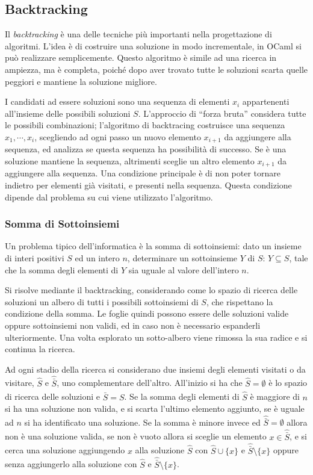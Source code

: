 \documentclass{article}
\numberwithin{equation}{subsection}
\begin{document}
\subsection{Backtracking}

Il \textit{backtracking} è una delle tecniche più importanti nella progettazione di algoritmi. L'idea è di costruire una soluzione in modo incrementale, in OCaml si può realizzare semplicemente. Questo algoritmo è simile ad una ricerca in ampiezza, ma è completa, poiché dopo aver trovato tutte le soluzioni scarta quelle peggiori e mantiene la soluzione migliore. 

I candidati ad essere soluzioni sono una sequenza di elementi $x_i$ appartenenti all'insieme delle possibili soluzioni $S$. L'approccio di ``forza bruta'' considera tutte le possibili combinazioni; l'algoritmo di backtracing costruisce una sequenza $x_1,\cdots,x_i$, scegliendo ad ogni passo un nuovo elemento $x_{i+1}$ da aggiungere alla sequenza, ed analizza se questa sequenza ha possibilità di successo. Se è una soluzione mantiene la sequenza, altrimenti sceglie un altro elemento $x_{i+1}$ da aggiungere alla sequenza. 
Una condizione principale è di non poter tornare indietro per elementi già visitati, e presenti nella sequenza. Questa condizione dipende dal problema su cui viene utilizzato l'algoritmo. 

\subsubsection{Somma di Sottoinsiemi}

Un problema tipico dell'informatica è la somma di sottoinsiemi: dato un insieme di interi positivi $S$ ed un intero $n$, determinare un sottoinsieme $Y$ di $S$: $Y\subseteq S$, tale che la somma degli elementi di $Y$ sia uguale al valore dell'intero $n$. 

Si risolve mediante il backtracking, considerando come lo spazio di ricerca delle soluzioni un albero di tutti i possibili sottoinsiemi di $S$, che rispettano la condizione della somma. Le foglie quindi possono essere delle soluzioni valide oppure sottoinsiemi non validi, ed in caso non è necessario espanderli ulteriormente. Una volta esplorato un sotto-albero viene rimossa la sua radice e si continua la ricerca. 


Ad ogni stadio della ricerca si considerano due insiemi degli elementi visitati o da visitare, $\hat{S}$ e $\hat{\bar{S}}$, uno complementare dell'altro. All'inizio si ha che $\hat{S}=\emptyset$ è lo spazio di ricerca delle soluzioni e $\hat{\bar{S}}=S$. 
Se la somma degli elementi di $\hat{S}$ è maggiore di $n$ si ha una soluzione non valida, e si scarta l'ultimo elemento aggiunto, se è uguale ad $n$ si ha identificato una soluzione. Se la somma è minore invece ed $\hat{\bar{S}}=\emptyset$ allora non è una soluzione valida, se non è vuoto allora si sceglie un elemento $x\in\hat{\bar{S}}$, e si cerca una soluzione aggiungendo $x$ alla soluzione $\hat{S}$ con $\hat{S}\cup\{x\}$ e $\hat{\bar{S}}\setminus\{x\}$ oppure senza aggiungerlo alla soluzione con $\hat{S}$ e $\hat{\bar{S}}\setminus\{x\}$.  
\end{document}
